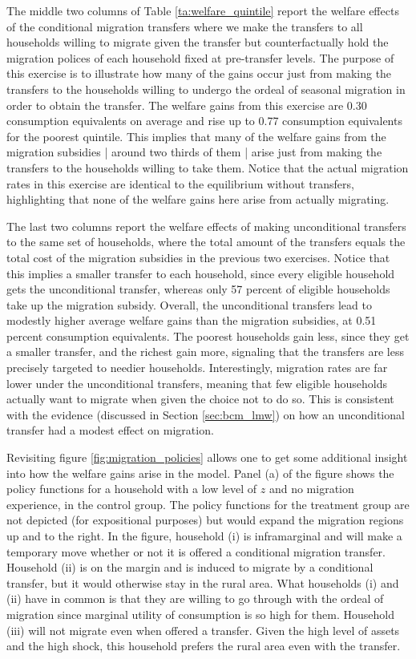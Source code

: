 \documentclass[12pt,pdftex]{article}
\begin{document}
The middle two columns of Table \ref{ta:welfare_quintile} report the welfare effects of the conditional migration transfers where we make the transfers to all households willing to migrate given the transfer but counterfactually hold the migration polices of each household fixed at pre-transfer levels. The purpose of this exercise is to illustrate how many of the gains occur just from making the transfers to the households willing to undergo the ordeal of seasonal migration in order to obtain the transfer. The welfare gains from this exercise are 0.30 consumption equivalents on average and rise up to 0.77 consumption equivalents for the poorest quintile. This implies that many of the welfare gains from the migration subsidies | around two thirds of them | arise just from making the transfers to the households willing to take them. Notice that the actual migration rates in this exercise are identical to the equilibrium without transfers, highlighting that none of the welfare gains here arise from actually migrating.

The last two columns report the welfare effects of making unconditional transfers to the same set of households, where the total amount of the transfers equals the total cost of the migration subsidies in the previous two exercises. Notice that this implies a smaller transfer to each household, since every eligible household gets the unconditional transfer, whereas only 57 percent of eligible households take up the migration subsidy. Overall, the unconditional transfers lead to modestly higher average welfare gains than the migration subsidies, at 0.51 percent consumption equivalents. The poorest households gain less, since they get a smaller transfer, and the richest gain more, signaling that the transfers are less precisely targeted to needier households. Interestingly, migration rates are far lower under the unconditional transfers, meaning that few eligible households actually want to migrate when given the choice not to do so. This is consistent with the evidence (discussed in Section \ref{sec:bcm_lmw}) on how an unconditional transfer had a modest effect on migration.

Revisiting figure \ref{fig:migration_policies} allows one to get some additional insight into how the welfare gains arise in the model. Panel (a) of the figure shows the policy functions for a household with a low level of $z$ and no migration experience, in the control group. The policy functions for the treatment group are not depicted (for expositional purposes) but would expand the migration regions up and to the right. In the figure, household (i) is inframarginal and will make a temporary move whether or not it is offered a conditional migration transfer. Household (ii) is on the margin and is induced to migrate by a conditional transfer, but it would otherwise stay in the rural area. What households (i) and (ii) have in common is that they are willing to go through with the ordeal of migration since marginal utility of consumption is so high for them. Household (iii) will not migrate even when offered a transfer. Given the high level of assets and the high shock, this household prefers the rural area even with the transfer.
\end{document}
